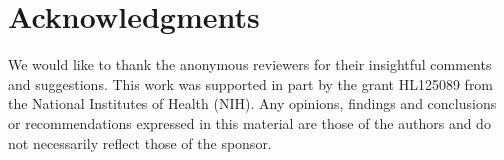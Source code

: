 \documentclass[11pt]{article}
\begin{document}
\section*{Acknowledgments}

We would like to thank the anonymous reviewers for
their insightful comments and suggestions.
This work was supported in part by the grant HL125089 from the National Institutes of Health (NIH). Any opinions, findings and conclusions or recommendations expressed in this material are those of the authors and do not necessarily 
reflect those of the sponsor.



\end{document}

